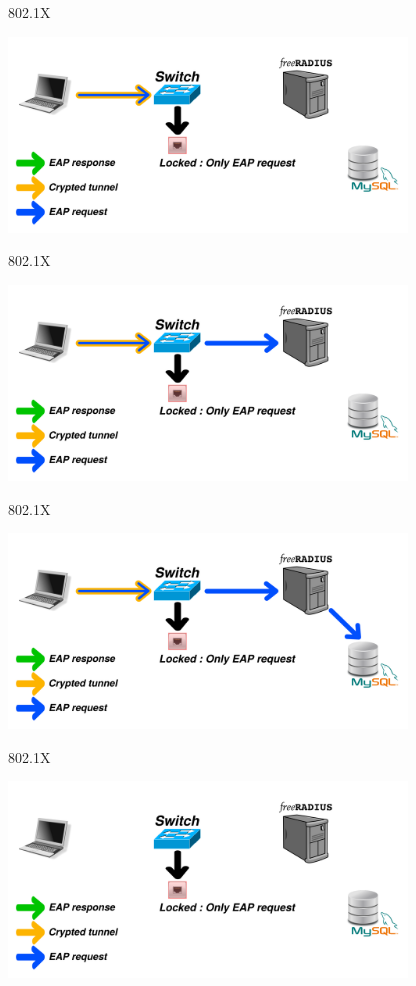 \documentclass[12pt]{beamer}
\begin{document}
\begin{frame}{802.1X}
\vfill
\begin{center}
    \includegraphics[width=300pt]{img/dot1x_2.pdf}
\end{center}
\vfill
\end{frame}

\begin{frame}{802.1X}
\vfill
\begin{center}
    \includegraphics[width=300pt]{img/dot1x_3.pdf}
\end{center}
\vfill
\end{frame}

\begin{frame}{802.1X}
\vfill
\begin{center}
    \includegraphics[width=300pt]{img/dot1x_4.pdf}
\end{center}
\vfill
\end{frame}

\begin{frame}{802.1X}
\vfill
\begin{center}
    \includegraphics[width=300pt]{img/dot1x_1.pdf}
\end{center}
\vfill
\end{frame}
\end{document}
